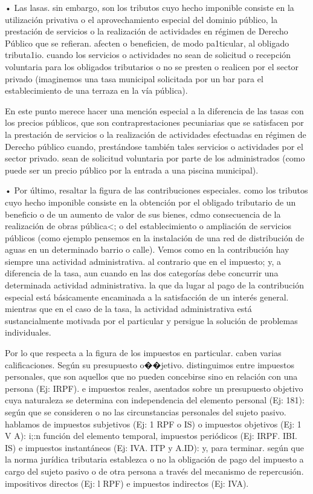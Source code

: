 \documentclass[10pt,a4paper]{article}
\begin{document}
• Las lasas. sin embargo, son los tributos cuyo hecho imponible consiste en la utilización privativa o el aprovechamiento especial del dominio público, la prestación de servicios o la realización de actividades en régimen de Derecho Público que se refieran. afecten o beneficien, de modo pa1ticular, al obligado tributa1io. cuando los servicios o actividades no sean de solicitud o recepción voluntaria para los obligados tributarios o no se presten o realicen por el sector privado (imaginemos una tasa municipal solicitada por un bar para el establecimiento de una terraza en la vía pública).

En este punto merece hacer una mención especial a la diferencia de las tasas con los precios públicos, que son contraprestaciones pecuniarias que se satisfacen por la prestación de servicios o la realización de actividades efectuadas en régimen de Derecho público cuando, prestándose también tales servicios o actividades por el sector privado. sean de solicitud voluntaria por parte de los administrados (como puede ser un precio público por la entrada a una piscina municipal).

• Por último, resaltar la figura de las contribuciones especiales. como los tributos cuyo hecho imponible consiste en la obtención por el obligado tributario de un beneficio o de un aumento de valor de sus bienes, cdmo consecuencia de la realización de obras pública<; o del establecimiento o ampliación de servicios públicos (como ejemplo pensemos en la instalación de una red de distribución de aguas en un determinado barrio o calle). Vemos como en la contribución hay siempre una actividad administrativa. al contrario que en el impuesto; y, a diferencia de la tasa, aun cuando en las dos categorías debe concurrir una determinada actividad administrativa. la que da lugar al pago de la contribución especial está básicamente encaminada a la satisfacción de un interés general. mientras que en el caso de la tasa, la actividad administrativa está sustancialmente motivada por el particular y persigue la solución de problemas individuales.

Por lo que respecta a la figura de los impuestos en particular. caben varias calificaciones. Según su presupuesto o��jetivo. distinguimos entre impuestos personales, que son aquellos que no pueden concebirse sino en relación con una persona (Ej: IRPF). e impuestos reales, asentados sobre un presupuesto objetivo cuya naturaleza se determina con independencia del elemento personal (Ej: 181): según que se consideren o no las circunstancias personales del sujeto pasivo. hablamos de impuestos subjetivos (Ej: 1 RPF o IS) o impuestos objetivos (Ej: 1 V A): i;:n función del elemento temporal, impuestos periódicos (Ej: IRPF. IBI. IS) e impuestos instantáneos (Ej: IVA. ITP y A.ID): y, para terminar. según que la norma jurídica tributaria establezca o no la obligación de pago del impuesto a cargo del sujeto pasivo o de otra persona a través del mecanismo de repercusión. impositivos directos (Ej: l RPF) e impuestos indirectos (Ej: IVA).
\end{document}
